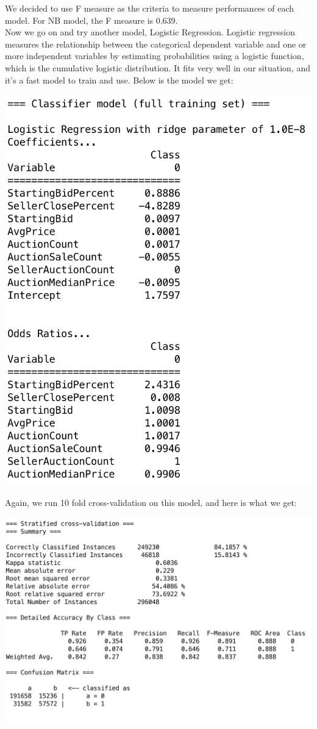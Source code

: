 \documentclass[CEJM,PDF]{cej} %
\begin{document}
We decided to use F measure as the criteria to measure performances of each model. For NB model, the F measure is 0.639.\\
Now we go on and try another model, Logistic Regression. Logistic regression measures the relationship between the categorical dependent variable and one or more independent variables by estimating probabilities using a logistic function, which is the cumulative logistic distribution. It fits very well in our situation, and it's a fast model to train and use. Below is the model we get:
\begin{center}
\includegraphics[scale=0.5]{weka-logi-model.png}
\end{center}
Again, we run 10 fold cross-validation on this model, and here is what we get:
\begin{center}
\includegraphics[scale=0.5]{weka-logi-result.png}
\end{center}
\end{document}
